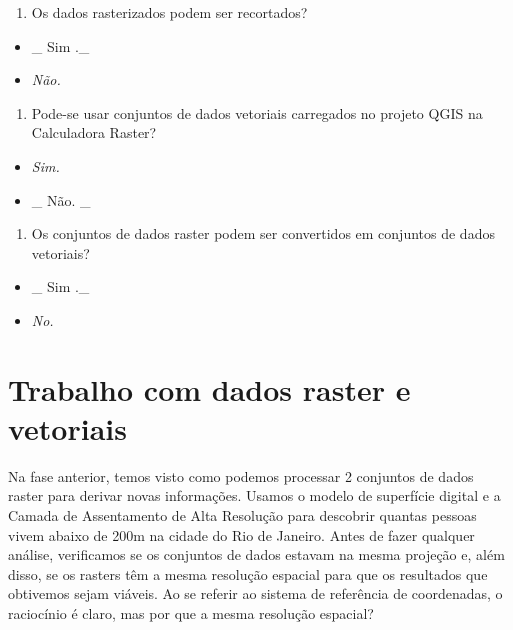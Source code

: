 \documentclass[
  portuguese,
]{krantz}
\providecommand{\tightlist}{%
  \setlength{\itemsep}{0pt}\setlength{\parskip}{0pt}}
\begin{document}
\begin{enumerate}
\def\labelenumi{\arabic{enumi}.}
\tightlist
\item
  Os dados rasterizados podem ser recortados?
\end{enumerate}

\begin{itemize}
\tightlist
\item
  \_ { Sim } .\_
\item
  \emph{Não.}
\end{itemize}

\begin{enumerate}
\def\labelenumi{\arabic{enumi}.}
\setcounter{enumi}{1}
\tightlist
\item
  Pode-se usar conjuntos de dados vetoriais carregados no projeto QGIS na Calculadora Raster?
\end{enumerate}

\begin{itemize}
\tightlist
\item
  \emph{Sim.}
\item
  \_ { Não. } \_
\end{itemize}

\begin{enumerate}
\def\labelenumi{\arabic{enumi}.}
\setcounter{enumi}{2}
\tightlist
\item
  Os conjuntos de dados raster podem ser convertidos em conjuntos de dados vetoriais?
\end{enumerate}

\begin{itemize}
\tightlist
\item
  \_ { Sim } .\_
\item
  \emph{No.}
\end{itemize}

\hypertarget{trabalho-com-dados-raster-e-vetoriais}{%
\section{Trabalho com dados raster e vetoriais}\label{trabalho-com-dados-raster-e-vetoriais}}

Na fase anterior, temos visto como podemos processar 2 conjuntos de dados raster para derivar novas informações. Usamos o modelo de superfície digital e a Camada de Assentamento de Alta Resolução para descobrir quantas pessoas vivem abaixo de 200m na \hspace{0pt}\hspace{0pt}cidade do Rio de Janeiro. Antes de fazer qualquer análise, verificamos se os conjuntos de dados estavam na mesma projeção e, além disso, se os rasters têm a mesma resolução espacial para que os resultados que obtivemos sejam viáveis. Ao se referir ao sistema de referência de coordenadas, o raciocínio é claro, mas por que a mesma resolução espacial?
\end{document}
